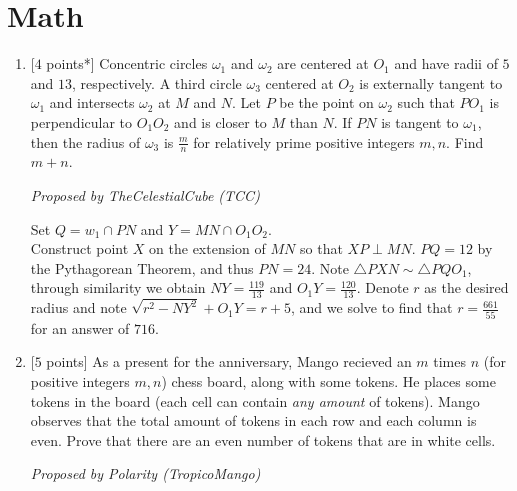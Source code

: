 \section*{\textsf{\textbf{\textcolor{meablue}{Math}}}}
\begin{enumerate}[align=left,start=1,label=\textbf{\textcolor{meablue}{Problem \arabic*}}]
    \item {[$4$ points*]} Concentric circles $\omega_1$ and $\omega_2$ are centered at $O_1$ and have radii of $5$ and $13$, respectively. A third circle $\omega_3$ centered at $O_2$ is externally tangent to $\omega_1$ and intersects $\omega_2$ at $M$ and $N$. Let $P$ be the point on $\omega_2$ such that $PO_1$ is perpendicular to $O_1 O_2$ and is closer to $M$ than $N$. If $PN$ is tangent to $\omega_1$, then the radius of $\omega_3$ is $\frac{m}{n}$ for relatively prime positive integers $m, n$. Find $m + n$.
    
    \textrm{\emph{Proposed by TheCelestialCube (TCC)}}

    \begin{solution}
        Set $Q = w_1 \cap PN$ and $Y = MN \cap O_1 O_2$. \\ Construct point $X$ on the extension of $MN$ so that $XP \perp MN$. $PQ = 12$ by the Pythagorean Theorem, and thus $PN = 24$. Note $\triangle PXN \sim \triangle P Q O_1$, through similarity we obtain $NY = \frac{119}{13}$ and $O_1 Y = \frac{120}{13}$. Denote $r$ as the desired radius and note $\sqrt{r^2 - NY^2} + O_1 Y = r + 5$, and we solve to find that $r = \frac{661}{55}$ for an answer of $716$.
    \end{solution}
    \item {[$5$ points]}
        As a present for the anniversary, Mango recieved an $m$ times $n$ (for positive integers $m, n$) chess board, along with some tokens. He places some tokens in the board (each cell can contain \emph{any amount} of tokens). Mango observes that the total amount of tokens in each row and each column is even. Prove that there are an even number of tokens that are in white cells.

    \textrm{\emph{Proposed by Polarity (TropicoMango)}}
    

\end{enumerate}
